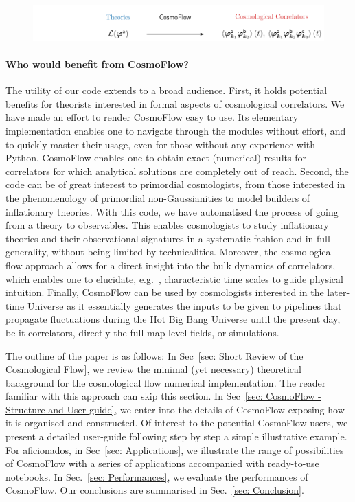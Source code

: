 \documentclass[11pt]{article}
\numberwithin{equation}{section} %
\begin{document}
\begin{figure}[h!]
   \centering
   \hspace*{-4cm}
   \includegraphics[width=1\textwidth]{Figures/CosmoFlowExplanation.pdf}
\end{figure}


\paragraph{Who would benefit from \textsf{CosmoFlow}?} The utility of our code extends to a broad audience. First, it holds potential benefits for theorists interested in formal aspects of cosmological correlators. We have made an effort to render \textsf{CosmoFlow} easy to use. Its elementary implementation enables one to navigate through the modules without effort, and to quickly master their usage, even for those without any experience with Python. \textsf{CosmoFlow} enables one to obtain exact (numerical) results for correlators for which analytical solutions are completely out of reach. Second, the code can be of great interest to primordial cosmologists, from those interested in the phenomenology of primordial non-Gaussianities to model builders of inflationary theories. With this code, we have automatised the process of going from a theory to observables. This enables cosmologists to study inflationary theories and their observational signatures in a systematic fashion and in full generality, without being limited by technicalities. Moreover, the cosmological flow approach allows for a direct insight into the bulk dynamics of correlators, which enables one to elucidate, e.g.~, characteristic time scales to guide physical intuition. Finally, \textsf{CosmoFlow} can be used by cosmologists interested in the later-time Universe as it essentially generates the inputs to be given to pipelines that propagate fluctuations during the Hot Big Bang Universe until the present day, be it correlators, directly the full map-level fields, or simulations.


\vskip 4pt
The outline of the paper is as follows: In Sec~\ref{sec: Short Review of the Cosmological Flow}, we review the minimal (yet necessary) theoretical background for the cosmological flow numerical implementation. The reader familiar with this approach can skip this section. In Sec~\ref{sec: CosmoFlow - Structure and User-guide}, we enter into the details of \textsf{CosmoFlow} exposing how it is organised and constructed. Of interest to the potential \textsf{CosmoFlow} users, we present a detailed user-guide following step by step a simple illustrative example. For aficionados, in Sec~\ref{sec: Applications}, we illustrate the range of possibilities of \textsf{CosmoFlow} with a series of applications accompanied with ready-to-use notebooks. In Sec.~\ref{sec: Performances}, we evaluate the performances of \textsf{CosmoFlow}. Our conclusions are summarised in Sec.~\ref{sec: Conclusion}. 
\end{document}
